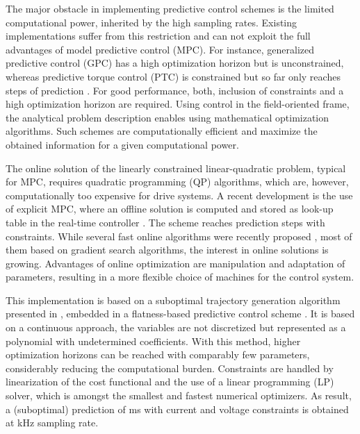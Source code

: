 \documentclass[a4paper,11pt,fleqn]{article}
\begin{document}
The major obstacle in implementing predictive control schemes is the limited computational power, inherited by the high sampling rates. Existing implementations suffer from this restriction and can not exploit the full advantages of model predictive control (MPC). For instance, generalized predictive control (GPC) has a high optimization horizon but is unconstrained, whereas predictive torque control (PTC) is constrained but so far only reaches  steps of prediction \cite{Cortes}. For good performance, both, inclusion of constraints and a high optimization horizon are required. Using control in the field-oriented frame, the analytical problem description enables using mathematical optimization algorithms. Such schemes are computationally efficient and maximize the obtained information for a given computational power. 

The online solution of the linearly constrained linear-quadratic problem, typical for MPC, requires quadratic programming (QP) algorithms, which are, however, computationally too expensive for drive systems. A recent development is the use of explicit MPC, where an offline solution is computed and stored as look-up table in the real-time controller \cite{Kuehl} \cite{inhFW}. The scheme reaches  prediction steps with constraints. While several fast online algorithms were recently proposed \cite{Kouvaritakis} \cite{onlineMPC}, most of them based on gradient search algorithms, the interest in online solutions is growing. Advantages of online optimization are manipulation and adaptation of parameters, resulting in a more flexible choice of machines for the control system.

This implementation is based on a suboptimal trajectory generation algorithm presented in \cite{SK10}, embedded in a flatness-based predictive control scheme \cite{Fliess}. It is based on a continuous approach, the variables are not discretized but represented as a polynomial with undetermined coefficients. With this method, higher optimization horizons can be reached with comparably few parameters, considerably reducing the computational burden. Constraints are handled by linearization of the cost functional and the use of a linear programming (LP) solver, which is amongst the smallest and fastest numerical optimizers. As result, a (suboptimal) prediction of  ms with current and voltage constraints is obtained at  kHz sampling rate.
\end{document}
